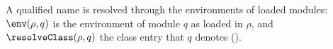 A qualified name is resolved through the environments of loaded modules: $\env(\rho, q)$ is the
environment of module $q$ as loaded in $\rho$, and $\resolveClass(\rho, q)$ the class entry that $q$
denotes ().


